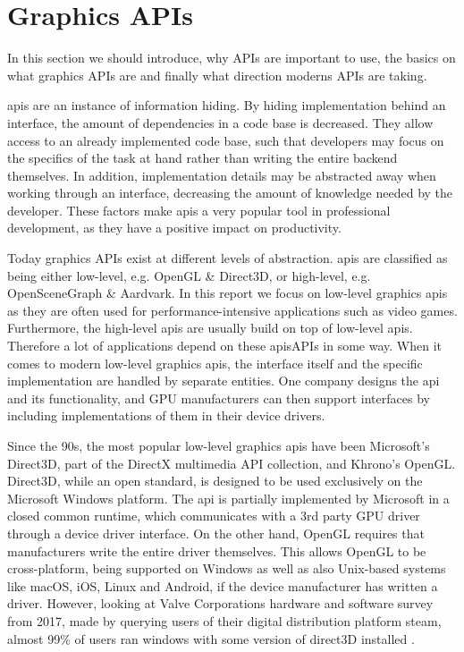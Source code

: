 \section{Graphics APIs}\label{sec:graphics_apis}
\begin{sectionmeta}
In this section we should introduce, why APIs are important to use, the basics on what graphics APIs are and finally what direction moderns APIs are taking.
\end{sectionmeta}
\glspl{api} are an instance of information hiding.
By hiding implementation behind an interface, the amount of dependencies in a code base is decreased.  
They allow access to an already implemented code base, such that developers may focus on the specifics of the task at hand rather than writing the entire backend themselves.
In addition, implementation details may be abstracted away when working through an interface,  decreasing the amount of knowledge needed by the developer.
These factors make \glspl{api} a very popular tool in professional development, as they have a positive impact on productivity. 

Today graphics APIs exist at different levels of abstraction. 
\glspl{api} are classified as being either low-level, e.g. OpenGL \& Direct3D, or high-level, e.g. OpenSceneGraph \& Aardvark.
In this report we focus on low-level graphics \glspl{api} as they are often used for performance-intensive applications such as video games.
Furthermore, the high-level \glspl{api} are usually build on top of low-level \glspl{api}.  
Therefore a lot of applications depend on these \glspl{api}APIs in some way.
When it comes to modern low-level graphics \glspl{api}, the interface itself and the specific implementation are handled by separate entities. 
One company designs the \gls{api} and its functionality, and GPU manufacturers can then support interfaces by including implementations of them in their device drivers.

Since the 90s, the most popular low-level graphics \glspl{api} have been Microsoft’s Direct3D, part of the DirectX multimedia API collection, and Khrono’s OpenGL. 
Direct3D, while an open standard, is designed to be used exclusively on the Microsoft Windows platform.
The \gls{api} is partially implemented by Microsoft in a closed common runtime, which communicates with a 3rd party GPU driver through a device driver interface.
On the other hand, OpenGL requires that manufacturers write the entire driver themselves.
This allows OpenGL to be cross-platform, being supported on Windows as well as also Unix-based systems like macOS, iOS, Linux and Android, if the device manufacturer has written a driver. However, looking at Valve Corporations hardware and software survey from 2017, made by querying users of their digital distribution platform steam,  almost 99\% of users ran windows with some version of direct3D installed \cite{steamsurvey}.  


